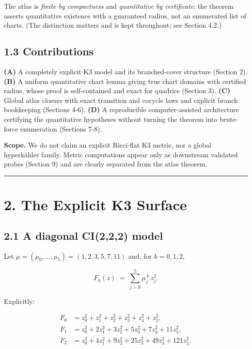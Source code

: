 The atlas is \emph{finite by compactness} and \emph{quantitative by certificate}: the theorem asserts quantitative existence with a guaranteed radius, not an enumerated list of charts. (The distinction matters and is kept throughout; see Section 4.2.)

\subsection{1.3 Contributions}\label{contributions}

\textbf{(A)} A completely explicit K3 model and its branched-cover structure (Section 2). \textbf{(B)} A uniform quantitative chart lemma giving true chart domains with certified radius, whose proof is self-contained and exact for quadrics (Section 3). \textbf{(C)} Global atlas closure with exact transition and cocycle laws and explicit branch bookkeeping (Sections 4-6). \textbf{(D)} A reproducible computer-assisted architecture certifying the quantitative hypotheses without turning the theorem into brute-force enumeration (Sections 7-8).

\textbf{Scope.} We do not claim an explicit Ricci-flat K3 metric, nor a global hyperkähler family. Metric computations appear only as downstream validated probes (Section 9) and are clearly separated from the atlas theorem.

\begin{center}\rule{\linewidth}{0.5pt}\end{center}

\section{2. The Explicit K3 Surface}\label{the-explicit-k3-surface}

\subsection{2.1 A diagonal CI(2,2,2) model}\label{a-diagonal-ci222-model}

Let \(\mu = (\mu_0, \dots, \mu_5) = (1, 2, 3, 5, 7, 11)\) and, for \(k = 0, 1, 2\),

\[F_k(z) \;=\; \sum_{j=0}^{5} \mu_j^{\,k}\, z_j^2 .\]

Explicitly:

\[
\begin{aligned}
F_0 &= z_0^2 + z_1^2 + z_2^2 + z_3^2 + z_4^2 + z_5^2,\\
F_1 &= z_0^2 + 2 z_1^2 + 3 z_2^2 + 5 z_3^2 + 7 z_4^2 + 11 z_5^2,\\
F_2 &= z_0^2 + 4 z_1^2 + 9 z_2^2 + 25 z_3^2 + 49 z_4^2 + 121 z_5^2,
\end{aligned}
\]

